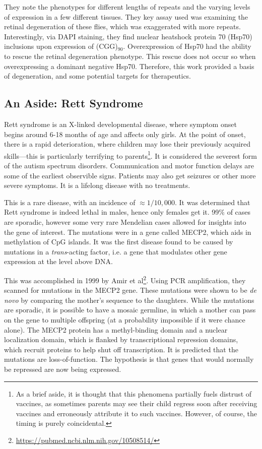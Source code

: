 They note the phenotypes for different lengths of repeats and the varying levels of expression in a few different tissues. They key assay used was examining the retinal degeneration of these flies, which was exaggerated with more repeats. Interestingly, via DAPI staining, they find nuclear heatshock protein 70 (Hsp70) inclusions upon expression of (CGG)$_{90}$. Overexpression of Hsp70 had the ability to rescue the retinal degeneration phenotype. This rescue does not occur so when overexpressing a dominant negative Hsp70. Therefore, this work provided a basis of degeneration, and some potential targets for therapeutics.

\subsection*{An Aside: Rett Syndrome}

Rett syndrome is an X-linked developmental disease, where symptom onset begins around 6-18 months of age and affects only girls. At the point of onset, there is a rapid deterioration, where children may lose their previously acquired skills---this is particularly terrifying to parents\footnote{As a brief aside, it is thought that this phenomena partially fuels distrust of vaccines, as sometimes parents may see their child regress soon after receiving vaccines and erroneously attribute it to such vaccines. However, of course, the timing is purely coincidental.}. It is considered the severest form of the autism spectrum disorders. Communication and motor function delays are some of the earliest observible signs. Patients may also get seizures or other more severe symptoms. It is a lifelong disease with no treatments.\newline

This is a rare disease, with an incidence of $\approx 1/10,000$. It was determined that Rett syndrome is indeed lethal in males, hence only females get it. 99\% of cases are sporadic, however some very rare Mendelian cases allowed for insights into the gene of interest. The mutations were in a gene called MECP2, which aids in methylation of CpG islands. It was the first disease found to be caused by mutations in a \textit{trans}-acting factor, i.e. a gene that modulates other gene expression at the level above DNA.\newline

This was accomplished in 1999 by Amir et al\footnote{\url{https://pubmed.ncbi.nlm.nih.gov/10508514/}}. Using PCR amplification, they scanned for mutations in the MECP2 gene. These mutations were shown to be \textit{de novo} by comparing the mother's sequence to the daughters. While the mutations are sporadic, it is possible to have a mosaic germline, in which a mother can pass on the gene to multiple offspring (at a probability impossible if it were chance alone). The MECP2 protein has a methyl-binding domain and a nuclear localization domain, which is flanked by transcriptional repression domains, which recruit proteins to help shut off transcription. It is predicted that the mutations are loss-of-function. The hypothesis is that genes that would normally be repressed are now being expressed.\newline

